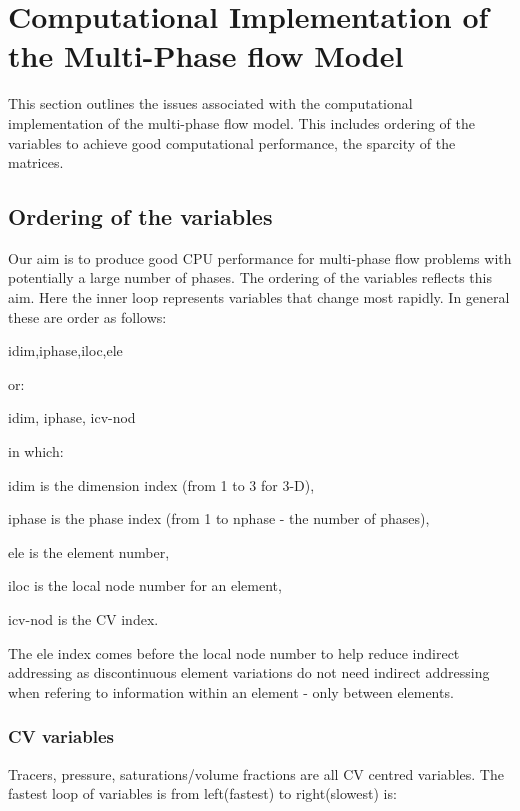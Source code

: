 \pagebreak



\section{Computational Implementation of the Multi-Phase flow Model}
\label{Computational Implementation} 

This section outlines the issues associated with the 
computational implementation of the multi-phase flow model. 
This includes ordering of the variables to achieve good computational 
performance, the sparcity of the matrices. 

\subsection{Ordering of the variables}
\label{Ordering} 
Our aim is to produce good CPU performance for multi-phase flow 
problems with potentially a large number of phases. The ordering of 
the variables reflects this aim. Here the inner loop represents variables that 
change most rapidly. 
In general these are order as follows: 

\par\noindent
idim,iphase,iloc,ele

\par\noindent
or:


\par\noindent
idim, iphase, icv-nod

\par\noindent
in which:
\par\noindent
 idim is the dimension index (from 1 to 3 for 3-D), 
\par\noindent
iphase is the phase index (from 1 to nphase - the number of phases), 
\par\noindent
ele is the element number, 
\par\noindent
iloc is the local node number for an element, 
\par\noindent
icv-nod is the CV index.

The ele index comes before the local node number to help reduce indirect addressing 
as discontinuous element variations do not need indirect addressing when refering 
to information within an element - only between elements. 

\subsubsection{CV variables} 
Tracers, pressure, saturations/volume fractions are all CV centred variables. 
The fastest loop of variables is from left(fastest) to right(slowest) is: 

